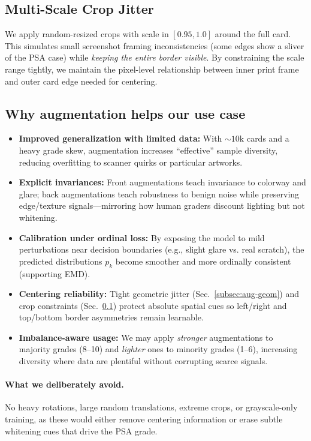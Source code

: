 \documentclass[12pt]{article}
\begin{document}
\subsection{Multi-Scale Crop Jitter}
\label{subsec:aug-crop}
We apply random-resized crops with scale in $[0.95,1.0]$ around the full card. 
This simulates small screenshot framing inconsistencies (some edges show a sliver of the PSA case) while \emph{keeping the entire border visible}.
By constraining the scale range tightly, we maintain the pixel-level relationship between inner print frame and outer card edge needed for centering.

\subsection{Why augmentation helps our use case}
\label{subsec:aug-benefits}
\begin{itemize}
  \item \textbf{Improved generalization with limited data:} With $\sim 10$k cards and a heavy grade skew, augmentation increases ``effective'' sample diversity, reducing overfitting to scanner quirks or particular artworks.
  \item \textbf{Explicit invariances:} Front augmentations teach invariance to colorway and glare; back augmentations teach robustness to benign noise while preserving edge/texture signals—mirroring how human graders discount lighting but not whitening.
  \item \textbf{Calibration under ordinal loss:} By exposing the model to mild perturbations near decision boundaries (e.g., slight glare vs. real scratch), the predicted distributions $p_k$ become smoother and more ordinally consistent (supporting EMD).
  \item \textbf{Centering reliability:} Tight geometric jitter (Sec.~\ref{subsec:aug-geom}) and crop constraints (Sec.~\ref{subsec:aug-crop}) protect absolute spatial cues so left/right and top/bottom border asymmetries remain learnable.
  \item \textbf{Imbalance-aware usage:} We may apply \emph{stronger} augmentations to majority grades (8--10) and \emph{lighter} ones to minority grades (1--6), increasing diversity where data are plentiful without corrupting scarce signals.
\end{itemize}

\paragraph{What we deliberately avoid.}
No heavy rotations, large random translations, extreme crops, or grayscale-only training, as these would either remove centering information or erase subtle whitening cues that drive the PSA grade.
\end{document}
